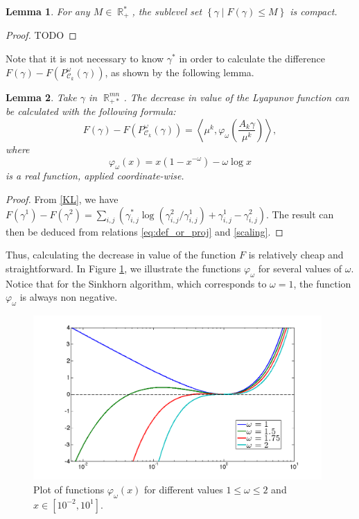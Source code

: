 \documentclass{article} %
\newcommand{\scal}[2]{\left\langle #1 , #2 \right\rangle}
\DeclareMathOperator{\IR}{\mathbb{R}}
\DeclareMathOperator{\Ccal}{\mathcal{C}}
\theoremstyle{plain}
\newtheorem{lemma}{Lemma}
\theoremstyle{definition}
\theoremstyle{remark}
\begin{document}
\begin{lemma} \label{lemma:KL_compact}
	For any $M \in \IR_+^*$, the sublevel set $\left\{ \gamma \mid F(\gamma) \le M \right\}$ is compact.
\end{lemma}
\begin{proof}
	{\color{red} TODO}
\end{proof}


Note that it is not necessary to know $\gamma^*$ in order to calculate the difference $F(\gamma) - F(P^\omega_{\Ccal_k}(\gamma))$, as shown by the following lemma.
\begin{lemma}\label{lemma:lyapunov_decrease}
	Take $\gamma$ in $\IR^{mn}_{+*}$. The decrease in value of the Lyapunov function can be calculated with the following formula:
	\begin{equation} \label{eq:kl_diff_scal}
	F(\gamma) - F(P^\omega_{\Ccal_k}(\gamma)) = 
	\scal{\mu^k}{\varphi_\omega \left(\frac{A_k \gamma}{\mu^k}\right)},
	\end{equation}
	where
	\begin{equation}
	\varphi_\omega(x) = x(1-x^{-\omega}) - \omega \log x
	\end{equation}
	is a real function, applied coordinate-wise.
\end{lemma}
\begin{proof}
From \eqref{KL}, we have $F(\gamma^1)-F(\gamma^2)= \sum_{i,j}\left(\gamma^*_{i,j}\log(\gamma^2_{i,j}/\gamma^1_{i,j})+\gamma^1_{i,j}-\gamma^2_{i,j}\right)$. The result can then be deduced from relations \eqref{eq:def_or_proj} and \eqref{scaling}.
\end{proof}
Thus, calculating the decrease in value of the function $F$ is relatively cheap and straightforward. In Figure \ref{phi_omega}, we illustrate the functions  $\varphi_\omega$ for several values of $\omega$. Notice that for the Sinkhorn algorithm, which corresponds to $\omega=1$, the function $\varphi_\omega$ is always non negative.
\begin{figure}[ht!]
\begin{center}
\includegraphics[width=11cm]{phi_omega.png}
\caption{\label{phi_omega} Plot of functions $\varphi_\omega(x)$ for different values $1\leq \omega\leq 2$ and   $x\in[10^{-2}, 10^1]$.}
\end{center}
\end{figure}
\end{document}
